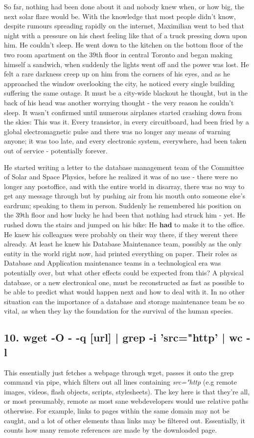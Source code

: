 So far, nothing had been done about it and nobody knew when, or how big, the next solar flare would be. With the knowledge that most people didn't know, despite rumours spreading rapidly on the internet, Maximilian went to bed that night with a pressure on his chest feeling like that of a truck pressing down upon him. He couldn't sleep. He went down to the kitchen on the bottom floor of the two room apartment on the 39th floor in central Toronto and began making himself a sandwich, when suddenly the lights went off and the power was lost. He felt a rare darkness creep up on him from the corners of his eyes, and as he approached the window overlooking the city, he noticed every single building suffering the same outage. It must be a city-wide blackout he thought, but in the back of his head was another worrying thought - the very reason he couldn't sleep. It wasn't confirmed until numerous airplanes started crashing down from the skies: This was it. Every transistor, in every circuitboard, had been fried by a global electromagnetic pulse and there was no longer any means of warning anyone; it was too late, and every electronic system, everywhere, had been taken out of service - potentially forever.     

He started writing a letter to the database management team of the Committee of Solar and Space Physics, before he realized it was of no use - there were no longer any postoffice, and with the entire world in disarray, there was no way to get any message through but by pushing air from his mouth onto someone else's eardrum; speaking to them in person. Suddenly he remembered his position on the 39th floor and how lucky he had been that nothing had struck him - yet. He rushed down the stairs and jumped on his bike: He \textbf{had} to make it to the office. He knew his colleagues were probably on their way there, if they werent there already. At least he knew his Database Maintenance team, possibly as the only entity in the world right now, had printed everything on paper. Their roles as Database and Application maintenance teams in a technological era was potentially over, but what other effects could be expected from this? A physical database, or a new electronical one, must be reconstructed as fast as possible to be able to predict what would happen next and how to deal with it. In no other situation can the importance of a database and storage maintenance team be so vital, as when they lay the foundation for the survival of the human species. 

\subsection{10. wget -O - -q [url] | grep -i 'src="http' | wc -l}
This essentially just fetches a webpage through wget, passes it onto the grep command via pipe, which filters out all lines containing \textit{src="http} (e.g remote images, videos, flash objects, scripts, stylesheets). The key here is that they're all, or most presumably, remote as most sane webdevelopers would use relative paths otherwise. For example, links to pages within the same domain may not be caught, and a lot of other elements than links may be filtered out. Essentially, it counts how many remote references are made by the downloaded page.

